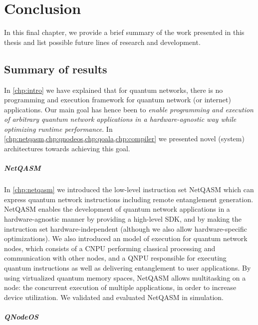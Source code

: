 \chapter{Conclusion}
\label{chp:conclusion}

In this final chapter, we provide a brief summary of the work presented in this thesis and list possible future lines of research and development.

\section{Summary of results}
In \cref{chp:intro} we have explained that for quantum networks, there is no programming and execution framework for quantum network (or internet) applications.
Our main goal has hence been to \emph{enable programming and execution of arbitrary quantum network applications in a hardware-agnostic way while optimizing runtime performance}.
In \cref{chp:netqasm,chp:qnodeos,chp:qoala,chp:compiler} we presented novel (system) architectures towards achieving this goal.


\paragraph{NetQASM}
In \cref{chp:netqasm} we introduced the low-level instruction set NetQASM which can express quantum network instructions including remote entanglement generation.
NetQASM enables the development of quantum network applications in a hardware-agnostic manner by providing a high-level SDK, and by making the instruction set hardware-independent (although we also allow hardware-specific optimizations).
We also introduced an model of execution for quantum network nodes, which consists of a CNPU performing classical processing and communication with other nodes, and a QNPU responsible for executing quantum instructions as well as delivering entanglement to user applications.
By using virtualized quantum memory spaces, NetQASM allows multitasking on a node: the concurrent execution of multiple applications, in order to increase device utilization.
We validated and evaluated NetQASM in simulation.


\paragraph{QNodeOS}

